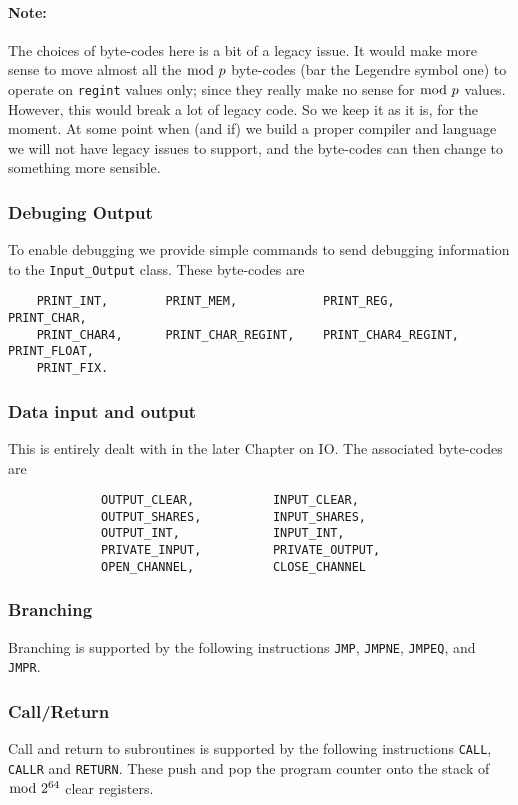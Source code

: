 \paragraph{Note:}
The choices of byte-codes here is a bit of a legacy issue. It would
make more sense to move almost all the $\bmod \; p$ byte-codes (bar the Legendre symbol
one) to operate on \verb|regint| values only; since they really make
no sense for $\bmod \; p$ values. However, this would break a lot of legacy code.
So we keep it as it is, for the moment. At some point when (and if) we build a proper
compiler and language we will not have legacy issues to support, and the
byte-codes can then change to something more sensible.

\subsubsection{Debuging Output}
To enable debugging we provide simple commands to send
debugging information to the \verb+Input_Output+ class.
These byte-codes are
\begin{verbatim}
    PRINT_INT,        PRINT_MEM,            PRINT_REG,              PRINT_CHAR,
    PRINT_CHAR4,      PRINT_CHAR_REGINT,    PRINT_CHAR4_REGINT,     PRINT_FLOAT,
    PRINT_FIX.
\end{verbatim}

\subsubsection{Data input and output}
This is entirely dealt with in the later Chapter on IO.
The associated byte-codes are
\begin{verbatim}
             OUTPUT_CLEAR,           INPUT_CLEAR,
             OUTPUT_SHARES,          INPUT_SHARES,
             OUTPUT_INT,             INPUT_INT,
             PRIVATE_INPUT,          PRIVATE_OUTPUT,
             OPEN_CHANNEL,           CLOSE_CHANNEL
\end{verbatim}

\subsubsection{Branching}
Branching is supported by the following instructions
 \verb+JMP+,
    \verb+JMPNE+,
    \verb+JMPEQ+, and
    \verb+JMPR+.

\subsubsection{Call/Return}
Call and return to subroutines is supported by the following
instructions
\verb+CALL+, \verb+CALLR+ and \verb+RETURN+.
These push and pop the program counter onto the stack of
$\bmod \; 2^{64}$ clear registers.

